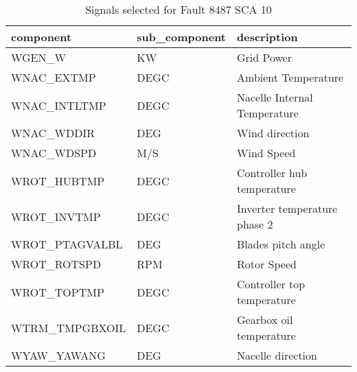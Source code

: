 \begin{table}[h!t]
    \centering
    \begin{tabular}{|l|l|l|}
    \hline
        component & sub\_component & description \\ \hline
        WGEN\_W & KW & Grid Power \\ \hline
        WNAC\_EXTMP & DEGC & Ambient Temperature \\ \hline
        WNAC\_INTLTMP & DEGC & Nacelle Internal Temperature \\ \hline
        WNAC\_WDDIR & DEG & Wind direction \\ \hline
        WNAC\_WDSPD & M/S & Wind Speed \\ \hline
        WROT\_HUBTMP & DEGC & Controller hub temperature \\ \hline
        WROT\_INVTMP & DEGC & Inverter temperature phase 2 \\ \hline
        WROT\_PTAGVALBL & DEG & Blades pitch angle \\ \hline
        WROT\_ROTSPD & RPM & Rotor Speed \\ \hline
        WROT\_TOPTMP & DEGC & Controller top temperature \\ \hline
        WTRM\_TMPGBXOIL & DEGC & Gearbox oil temperature \\ \hline
        WYAW\_YAWANG & DEG & Nacelle direction \\ \hline
    \end{tabular}
    \caption{Signals selected for Fault 8487 SCA 10}
\end{table}

